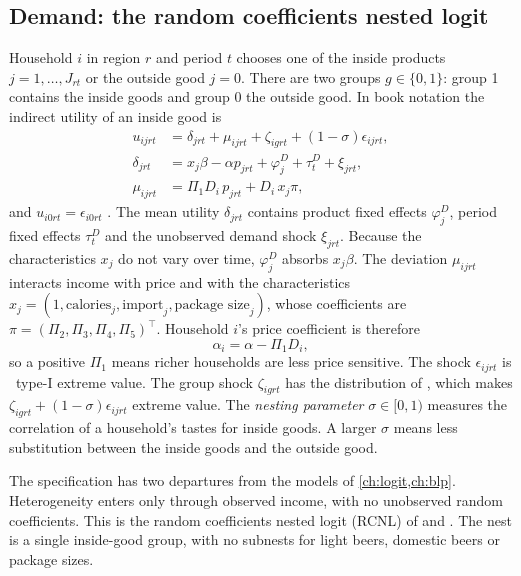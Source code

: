 \subsection{Demand: the random coefficients nested logit}\label{sec:11-mc-demand}

Household $i$ in region $r$ and period $t$ chooses one of the inside products $j = 1, \dots, J_{rt}$ or the outside
good $j = 0$. There are two groups $g \in \{0, 1\}$: group 1 contains the inside goods and group 0 the outside good.
In book notation the indirect utility of an inside good is
\begin{align}
  u_{ijrt} &= \delta_{jrt} + \mu_{ijrt} + \zeta_{igrt} + (1-\sigma)\epsilon_{ijrt}, \label{eq:11-mc-utility}\\
  \delta_{jrt} &= x_j\beta - \alpha p_{jrt} + \varphi^D_j + \tau^D_t + \xi_{jrt}, \label{eq:11-mc-delta}\\
  \mu_{ijrt} &= \Pi_1 D_i\, p_{jrt} + D_i\, x_j\pi, \label{eq:11-mc-mu}
\end{align}
and $u_{i0rt} = \epsilon_{i0rt}$ \citep[eqs.~(4)--(5)]{MillerWeinberg2017}. The mean utility $\delta_{jrt}$ contains
product fixed effects $\varphi^D_j$, period fixed effects $\tau^D_t$ and the unobserved demand shock $\xi_{jrt}$.
Because the characteristics $x_j$ do not vary over time, $\varphi_j^D$ absorbs $x_j\beta$. The deviation $\mu_{ijrt}$
interacts income with price and with the characteristics $x_j = (1, \text{calories}_j, \text{import}_j,
\text{package size}_j)$, whose coefficients are $\pi = (\Pi_2, \Pi_3, \Pi_4, \Pi_5)^\top$. Household $i$'s price
coefficient is therefore
\begin{equation}\label{eq:11-mc-alphai}
  \alpha_i = \alpha - \Pi_1 D_i ,
\end{equation}
so a positive $\Pi_1$ means richer households are less price sensitive. The shock $\epsilon_{ijrt}$ is \iid\ type-I
extreme value. The group shock $\zeta_{igrt}$ has the distribution of \citet{Cardell1997}, which makes
$\zeta_{igrt} + (1-\sigma)\epsilon_{ijrt}$ extreme value. The \emph{nesting parameter} $\sigma \in [0,1)$ measures the
correlation of a household's tastes for inside goods. A larger $\sigma$ means less substitution between the inside
goods and the outside good.

The specification has two departures from the models of \cref{ch:logit,ch:blp}. Heterogeneity enters only through
observed income, with no unobserved random coefficients. This is the random coefficients nested logit (RCNL) of
\citet{BrenkersVerboven2006} and \citet{GrigolonVerboven2014}. The nest is a single inside-good group, with no
subnests for light beers, domestic beers or package sizes.

